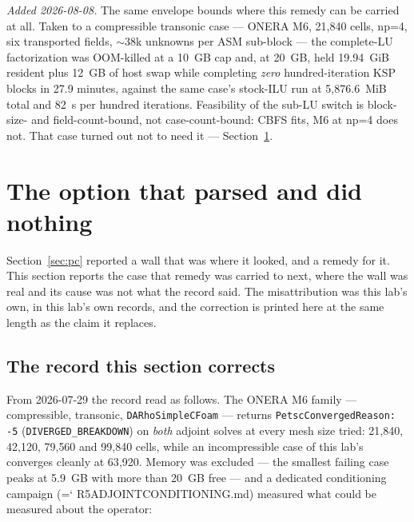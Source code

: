 \documentclass[11pt,a4paper]{article}
\newcommand{\artifact}[1]{{\small\ttfamily\hyphenchar\font=`\-\relax
  \def\_{\textunderscore\allowbreak}#1}}
\begin{document}
\emph{Added 2026-08-08.} The same envelope bounds where this remedy can be carried at all.
Taken to a compressible transonic case --- ONERA M6, 21{,}840 cells, np=4, six transported
fields, \(\sim\)38k unknowns per ASM sub-block --- the complete-LU factorization was
OOM-killed at a 10~GB cap and, at 20~GB, held 19.94~GiB resident plus 12~GB of host swap while
completing \emph{zero} hundred-iteration KSP blocks in 27.9 minutes, against the same case's
stock-ILU run at 5{,}876.6~MiB total and 82~s per hundred iterations. Feasibility of the sub-LU
switch is block-size- and field-count-bound, not case-count-bound: CBFS fits, M6 at np=4 does
not. That case turned out not to need it --- Section~\ref{sec:deadlever}.

\section{The option that parsed and did nothing}
\label{sec:deadlever}

Section~\ref{sec:pc} reported a wall that was where it looked, and a remedy for it. This
section reports the case that remedy was carried to next, where the wall was real and its
cause was not what the record said. The misattribution was this lab's own, in this lab's own
records, and the correction is printed here at the same length as the claim it replaces.

\subsection{The record this section corrects}

From 2026-07-29 the record read as follows. The ONERA M6 family --- compressible, transonic,
\texttt{DARhoSimpleCFoam} --- returns \texttt{PetscConvergedReason: -5}
(\texttt{DIVERGED\_BREAKDOWN}) on \emph{both} adjoint solves at every mesh size tried:
21{,}840, 42{,}120, 79{,}560 and 99{,}840 cells, while an incompressible case of this lab's
converges cleanly at 63{,}920. Memory was excluded --- the smallest failing case peaks at
5.9~GB with more than 20~GB free --- and a dedicated conditioning campaign
(\artifact{R5\_ADJOINT\_CONDITIONING.md}) measured what could be measured about the operator:
\end{document}
